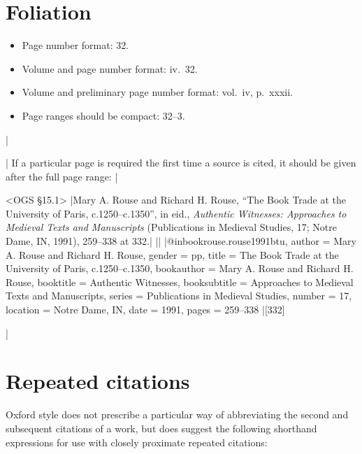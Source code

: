 \documentclass[extrafontsizes,11pt,a4paper,oneside]{memoir}
\begin{document}
\section{Foliation}

\begin{itemize}
  \item Page number format: 32.
  \item Volume and page number format: iv.\ 32.
  \item Volume and preliminary page number format: vol.\ iv, p.\ xxxii.
  \item Page ranges should be compact: 32--3.\\
\end{itemize}
|

\todoc[oxnotes]|
If a particular page is required the first time a source is cited, it should be given after the full page range:
|

\bibexample<OGS \S15.1>
|Mary A. Rouse and Richard H. Rouse, \enquote{The Book Trade at the University of Paris, c.1250--c.1350}, in eid., \emph{Authentic Witnesses: Approaches to Medieval Texts and Manuscripts} (Publications in Medieval Studies, 17; Notre Dame, IN, 1991), 259--338 at 332.|%
||%
|@inbook{rouse.rouse1991btu,
  author = {Mary A. Rouse and Richard H. Rouse},
  gender = {pp},
  title = {The Book Trade at the University of Paris, c.1250--c.1350},
  bookauthor = {Mary A. Rouse and Richard H. Rouse},
  booktitle = {Authentic Witnesses},
  booksubtitle = {Approaches to Medieval Texts and Manuscripts},
  series = {Publications in Medieval Studies},
  number = {17},
  location = {Notre Dame, IN},
  date = {1991},
  pages = {259--338}
}|[332]

\todoc[oxnotes]|
\section{Repeated citations}

Oxford style does not prescribe a particular way of abbreviating the second and subsequent citations of a work, but does suggest the following shorthand expressions for use with closely proximate repeated citations:
\end{document}
